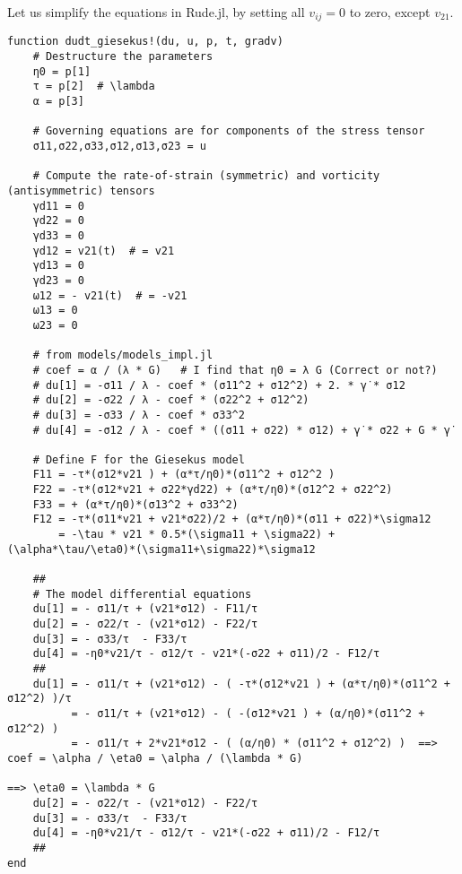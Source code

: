 \documentclass[10pt]{article}
\begin{document}
Let us simplify the equations in Rude.jl, by setting all $v_{ij}=0$ to zero, except $v_{21}$. 
\begin{verbatim}
function dudt_giesekus!(du, u, p, t, gradv)
    # Destructure the parameters
    η0 = p[1]
    τ = p[2]  # \lambda
    α = p[3]

    # Governing equations are for components of the stress tensor
    σ11,σ22,σ33,σ12,σ13,σ23 = u

    # Compute the rate-of-strain (symmetric) and vorticity (antisymmetric) tensors
    γd11 = 0
    γd22 = 0
    γd33 = 0
    γd12 = v21(t)  # = v21
    γd13 = 0
    γd23 = 0
    ω12 = - v21(t)  # = -v21
    ω13 = 0
    ω23 = 0

	# from models/models_impl.jl
	# coef = α / (λ * G)   # I find that η0 = λ G (Correct or not?) 
    # du[1] = -σ11 / λ - coef * (σ11^2 + σ12^2) + 2. * γ̇ * σ12 
    # du[2] = -σ22 / λ - coef * (σ22^2 + σ12^2)
    # du[3] = -σ33 / λ - coef * σ33^2
    # du[4] = -σ12 / λ - coef * ((σ11 + σ22) * σ12) + γ̇ * σ22 + G * γ̇

    # Define F for the Giesekus model
    F11 = -τ*(σ12*v21 ) + (α*τ/η0)*(σ11^2 + σ12^2 )
    F22 = -τ*(σ12*v21 + σ22*γd22) + (α*τ/η0)*(σ12^2 + σ22^2)
    F33 = + (α*τ/η0)*(σ13^2 + σ33^2)
	F12 = -τ*(σ11*v21 + v21*σ22)/2 + (α*τ/η0)*(σ11 + σ22)*\sigma12
		= -\tau	* v21 * 0.5*(\sigma11 + \sigma22) + (\alpha*\tau/\eta0)*(\sigma11+\sigma22)*\sigma12

    ##
    # The model differential equations
    du[1] = - σ11/τ + (v21*σ12) - F11/τ
    du[2] = - σ22/τ - (v21*σ12) - F22/τ
    du[3] = - σ33/τ  - F33/τ
    du[4] = -η0*v21/τ - σ12/τ - v21*(-σ22 + σ11)/2 - F12/τ
    ##
	du[1] = - σ11/τ + (v21*σ12) - ( -τ*(σ12*v21 ) + (α*τ/η0)*(σ11^2 + σ12^2) )/τ
	      = - σ11/τ + (v21*σ12) - ( -(σ12*v21 ) + (α/η0)*(σ11^2 + σ12^2) )
		  = - σ11/τ + 2*v21*σ12 - ( (α/η0) * (σ11^2 + σ12^2) )  ==> coef = \alpha / \eta0 = \alpha / (\lambda * G) 
		                                                                  ==> \eta0 = \lambda * G
    du[2] = - σ22/τ - (v21*σ12) - F22/τ
    du[3] = - σ33/τ  - F33/τ
    du[4] = -η0*v21/τ - σ12/τ - v21*(-σ22 + σ11)/2 - F12/τ
	##
end
\end{verbatim}
\end{document}
